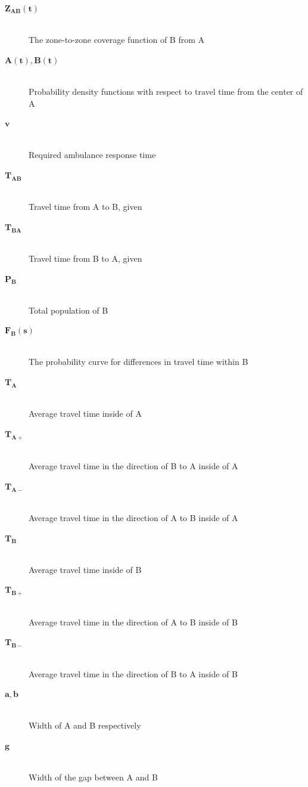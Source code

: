 \documentclass[notitlepage, 12pt]{article}
\begin{document}
\newpage


\begin{description}
    \item[$\mathbf{Z_{AB}(t)}$] \hfill \\
    	The zone-to-zone coverage function of B from A
    \item[$\mathbf{A(t), B(t)}$] \hfill \\
    	Probability density functions with respect to travel time from the center of A
    \item[$\mathbf{v}$] \hfill \\
    	Required ambulance response time
    \item[$\mathbf{T_{AB}}$] \hfill \\
    	Travel time from A to B, given
    \item[$\mathbf{T_{BA}}$] \hfill \\
    	Travel time from B to A, given
    \item[$\mathbf{P_B}$] \hfill \\
    	Total population of B
    \item[$\mathbf{F_B(s)}$] \hfill \\
    	The probability curve for differences in travel time within B
   \item[$\mathbf{T_A}$] \hfill \\
    	Average travel time inside of A
    \item[$\mathbf{T_{A+}}$] \hfill \\
    	Average travel time in the direction of B to A inside of A
    \item[$\mathbf{T_{A-}}$] \hfill \\
    	Average travel time in the direction of A to B inside of A
   \item[$\mathbf{T_B}$] \hfill \\
    	Average travel time inside of B
    \item[$\mathbf{T_{B+}}$] \hfill \\
    	Average travel time in the direction of A to B inside of B
    \item[$\mathbf{T_{B-}}$] \hfill \\
    	Average travel time in the direction of B to A inside of B
    \item[$\mathbf{a, b}$] \hfill \\
    	Width of A and B respectively
    \item[$\mathbf{g}$] \hfill \\
    	Width of the gap between A and B
\end{description}
\end{document}
